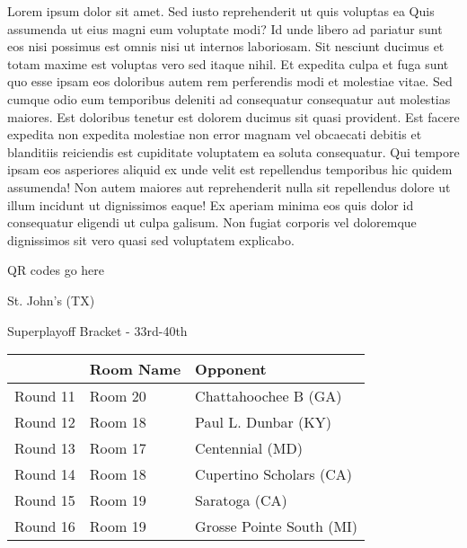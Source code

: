 \documentclass{article}%
\begin{document}
\vspace*{8pt}%
\linebreak%
\newline%
\newline%
    Lorem ipsum dolor sit amet. Sed iusto reprehenderit ut quis voluptas ea Quis assumenda ut eius magni eum voluptate modi? Id unde libero ad pariatur sunt eos nisi possimus est omnis nisi ut internos laboriosam. Sit nesciunt ducimus et totam maxime est voluptas vero sed itaque nihil. Et expedita culpa et fuga sunt quo esse ipsam eos doloribus autem rem perferendis modi et molestiae vitae.\newline%
\newline%
    Sed cumque odio eum temporibus deleniti ad consequatur consequatur aut molestias maiores. Est doloribus tenetur est dolorem ducimus sit quasi provident. Est facere expedita non expedita molestiae non error magnam vel obcaecati debitis et blanditiis reiciendis est cupiditate voluptatem ea soluta consequatur. Qui tempore ipsam eos asperiores aliquid ex unde velit est repellendus temporibus hic quidem assumenda!\newline%
\newline%
    Non autem maiores aut reprehenderit nulla sit repellendus dolore ut illum incidunt ut dignissimos eaque! Ex aperiam minima eos quis dolor id consequatur eligendi ut culpa galisum. Non fugiat corporis vel doloremque dignissimos sit vero quasi sed voluptatem explicabo.\newline%
\newline%
\vspace*{30pt}%
\begin{center}%
\begin{Huge}%
QR codes go here%
\end{Huge}%
\end{center}%
\newpage%
\begin{center}%
\begin{Huge}%
St. John's (TX)%
\end{Huge}%
\vspace*{8pt}%
\linebreak%
\begin{Large}%
Superplayoff Bracket {-} 33rd{-}40th%
\end{Large}%
\end{center}%
%
\begin{tabularx}{\textwidth}{|c|Y|Y|}%
\hline%
&Room Name&Opponent\\%
\hline%
Round 11&Room 20&Chattahoochee B (GA)\\%
Round 12&Room 18&Paul L. Dunbar (KY)\\%
Round 13&Room 17&Centennial (MD)\\%
Round 14&Room 18&Cupertino Scholars (CA)\\%
Round 15&Room 19&Saratoga (CA)\\%
Round 16&Room 19&Grosse Pointe South (MI)\\%
\hline%
\end{tabularx}%
\end{document}
